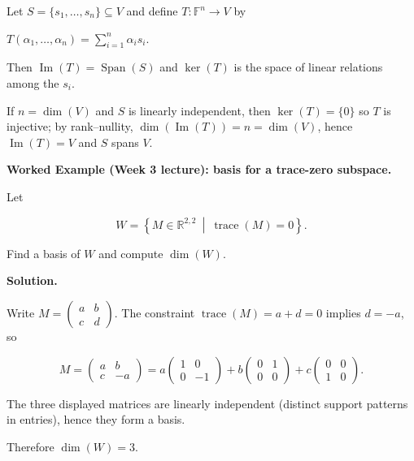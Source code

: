 \begin{extension}[title={Extension (Tutorial 3, Question 2, Method 2)}]

Let $S=\{s_1,\ldots,s_n\}\subseteq V$ and define $T:\mathbb{F}^n\to V$ by

$T(\alpha_1,\ldots,\alpha_n)=\sum_{i=1}^n \alpha_i s_i$.

Then $\operatorname{Im}(T)=\operatorname{Span}(S)$ and $\ker(T)$ is the space of linear relations among the $s_i$.

If $n=\dim(V)$ and $S$ is linearly independent, then $\ker(T)=\{0\}$ so $T$ is injective; by rank--nullity, $\dim(\operatorname{Im}(T))=n=\dim(V)$, hence $\operatorname{Im}(T)=V$ and $S$ spans $V$.

\end{extension}

\begin{examplebox}

\textbf{Worked Example (Week 3 lecture): basis for a trace-zero subspace.}

Let

\[
W=\left\{M\in\mathbb{R}^{2,2}\ \middle|\ \operatorname{trace}(M)=0\right\}.
\]

Find a basis of $W$ and compute $\dim(W)$.

\medskip

\textbf{Solution.}

Write $M=\begin{pmatrix}a&b\\c&d\end{pmatrix}$. The constraint $\operatorname{trace}(M)=a+d=0$ implies $d=-a$, so

\[
M=\begin{pmatrix}a&b\\c&-a\end{pmatrix}
=
a\begin{pmatrix}1&0\\0&-1\end{pmatrix}
+b\begin{pmatrix}0&1\\0&0\end{pmatrix}
+c\begin{pmatrix}0&0\\1&0\end{pmatrix}.
\]

The three displayed matrices are linearly independent (distinct support patterns in entries), hence they form a basis.

Therefore $\dim(W)=3$.

\end{examplebox}


